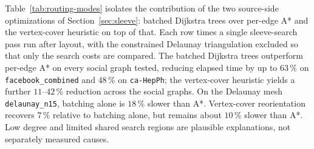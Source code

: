 \documentclass[review]{vgtc}          %
\begin{document}
Table~\ref{tab:routing-modes} isolates the contribution of the two
source-side optimizations of Section~\ref{sec:sleeve}: batched
Dijkstra trees over per-edge A* and the vertex-cover heuristic on top
of that.  Each row times a single sleeve-search pass run after layout,
with the constrained Delaunay triangulation excluded so that only the
search costs are compared. The batched Dijkstra trees outperform
per-edge A* on every social graph tested, reducing elapsed time
by up to $63$\,\% on \texttt{facebook\_combined}
and $48$\,\% on \texttt{ca-HepPh}; the vertex-cover heuristic yields
a further $11$--$42$\,\% reduction across the social graphs.
On the Delaunay mesh \texttt{delaunay\_n15}, batching alone is
$18$\,\% slower than A*. Vertex-cover reorientation recovers
$7$\,\% relative to batching alone, but remains about $10$\,\%
slower than A*. Low degree and limited shared search regions are
plausible explanations, not separately measured causes.
\end{document}
